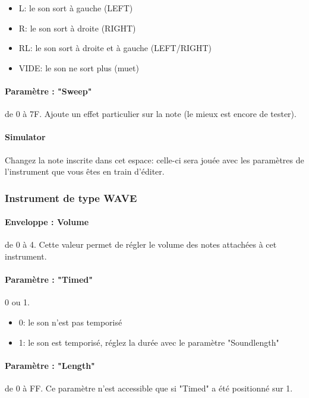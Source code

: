 \documentclass[12pt,a4paper]{article}
\begin{document}
    \begin{itemize}
        \item{L: le son sort à gauche (LEFT)}
        \item{R: le son sort à droite (RIGHT)}
        \item{RL: le son sort à droite et à gauche (LEFT/RIGHT)}
        \item{VIDE: le son ne sort plus (muet)}
    \end{itemize}

    \paragraph{Paramètre : "Sweep"} de 0 à 7F.
    Ajoute un effet particulier sur la note (le mieux est encore de tester).

    \paragraph{Simulator} Changez la note inscrite dans cet espace:
            celle-ci sera jouée avec les paramètres de l'instrument que vous êtes en train d'éditer.

    \subsubsection{Instrument de type WAVE}


    \paragraph{Enveloppe : Volume} de 0 à 4.
    Cette valeur permet de régler le volume des notes attachées à cet instrument.

    \paragraph{Paramètre : "Timed"} 0 ou 1.
    \medskip

    \begin{itemize}
            \item{0: le son n'est pas temporisé}
            \item{1: le son est temporisé, réglez la durée avec le paramètre "Soundlength"}
        \end{itemize}

    \paragraph{Paramètre : "Length"} de 0 à FF.
    Ce paramètre n'est accessible que si "Timed" a été positionné sur 1.
    \medskip
\end{document}
